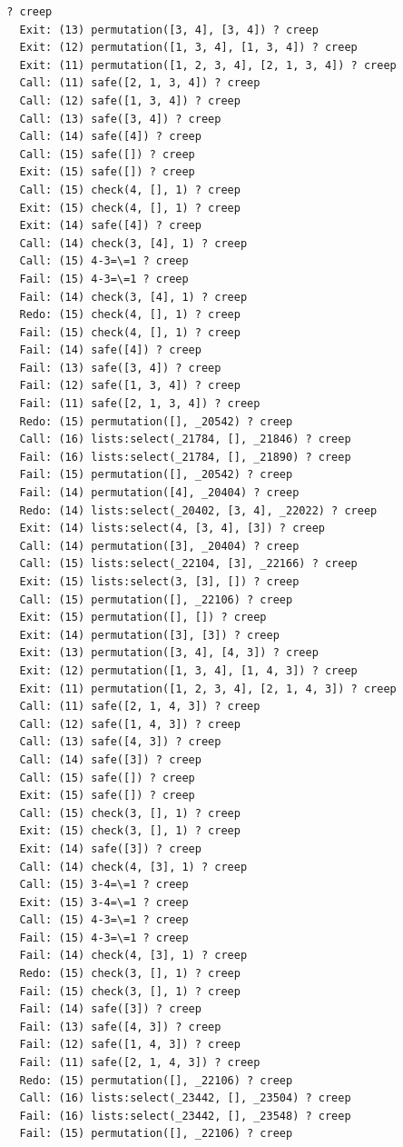 \documentclass{article}
\begin{document}
\begin{verbatim}
 ? creep
   Exit: (13) permutation([3, 4], [3, 4]) ? creep
   Exit: (12) permutation([1, 3, 4], [1, 3, 4]) ? creep
   Exit: (11) permutation([1, 2, 3, 4], [2, 1, 3, 4]) ? creep
   Call: (11) safe([2, 1, 3, 4]) ? creep
   Call: (12) safe([1, 3, 4]) ? creep
   Call: (13) safe([3, 4]) ? creep
   Call: (14) safe([4]) ? creep
   Call: (15) safe([]) ? creep
   Exit: (15) safe([]) ? creep
   Call: (15) check(4, [], 1) ? creep
   Exit: (15) check(4, [], 1) ? creep
   Exit: (14) safe([4]) ? creep
   Call: (14) check(3, [4], 1) ? creep
   Call: (15) 4-3=\=1 ? creep
   Fail: (15) 4-3=\=1 ? creep
   Fail: (14) check(3, [4], 1) ? creep
   Redo: (15) check(4, [], 1) ? creep
   Fail: (15) check(4, [], 1) ? creep
   Fail: (14) safe([4]) ? creep
   Fail: (13) safe([3, 4]) ? creep
   Fail: (12) safe([1, 3, 4]) ? creep
   Fail: (11) safe([2, 1, 3, 4]) ? creep
   Redo: (15) permutation([], _20542) ? creep
   Call: (16) lists:select(_21784, [], _21846) ? creep
   Fail: (16) lists:select(_21784, [], _21890) ? creep
   Fail: (15) permutation([], _20542) ? creep
   Fail: (14) permutation([4], _20404) ? creep
   Redo: (14) lists:select(_20402, [3, 4], _22022) ? creep
   Exit: (14) lists:select(4, [3, 4], [3]) ? creep
   Call: (14) permutation([3], _20404) ? creep
   Call: (15) lists:select(_22104, [3], _22166) ? creep
   Exit: (15) lists:select(3, [3], []) ? creep
   Call: (15) permutation([], _22106) ? creep
   Exit: (15) permutation([], []) ? creep
   Exit: (14) permutation([3], [3]) ? creep
   Exit: (13) permutation([3, 4], [4, 3]) ? creep
   Exit: (12) permutation([1, 3, 4], [1, 4, 3]) ? creep
   Exit: (11) permutation([1, 2, 3, 4], [2, 1, 4, 3]) ? creep
   Call: (11) safe([2, 1, 4, 3]) ? creep
   Call: (12) safe([1, 4, 3]) ? creep
   Call: (13) safe([4, 3]) ? creep
   Call: (14) safe([3]) ? creep
   Call: (15) safe([]) ? creep
   Exit: (15) safe([]) ? creep
   Call: (15) check(3, [], 1) ? creep
   Exit: (15) check(3, [], 1) ? creep
   Exit: (14) safe([3]) ? creep
   Call: (14) check(4, [3], 1) ? creep
   Call: (15) 3-4=\=1 ? creep
   Exit: (15) 3-4=\=1 ? creep
   Call: (15) 4-3=\=1 ? creep
   Fail: (15) 4-3=\=1 ? creep
   Fail: (14) check(4, [3], 1) ? creep
   Redo: (15) check(3, [], 1) ? creep
   Fail: (15) check(3, [], 1) ? creep
   Fail: (14) safe([3]) ? creep
   Fail: (13) safe([4, 3]) ? creep
   Fail: (12) safe([1, 4, 3]) ? creep
   Fail: (11) safe([2, 1, 4, 3]) ? creep
   Redo: (15) permutation([], _22106) ? creep
   Call: (16) lists:select(_23442, [], _23504) ? creep
   Fail: (16) lists:select(_23442, [], _23548) ? creep
   Fail: (15) permutation([], _22106) ? creep

\end{verbatim}
\end{document}
